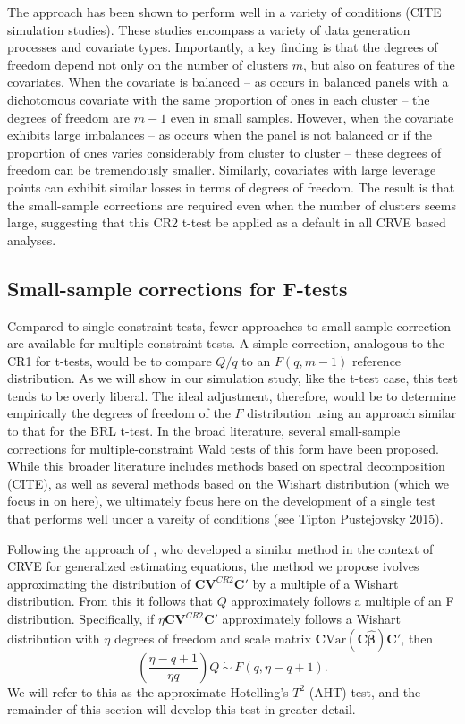 \documentclass[12pt]{article}\usepackage[]{graphicx}\usepackage[]{color}
\newcommand{\Var}{\text{Var}}
\newcommand{\bm}{\mathbf}
\newcommand{\bs}{\boldsymbol}
\begin{document}
The \citet{McCaffrey2001generalizations} approach has been shown to perform well in a variety of conditions (CITE simulation studies). These studies encompass a variety of data generation processes and covariate types. Importantly, a key finding is that the degrees of freedom depend not only on the number of clusters $m$, but also on features of the covariates. When the covariate is balanced -- as occurs in balanced panels with a dichotomous covariate with the same proportion of ones in each cluster -- the degrees of freedom are $m - 1$ even in small samples. However, when the covariate exhibits large imbalances -- as occurs when the panel is not balanced or if the proportion of ones varies considerably from cluster to cluster -- these degrees of freedom can be tremendously smaller. Similarly, covariates with large leverage points can exhibit similar losses in terms of degrees of freedom. The result is that the small-sample corrections are required even when the number of clusters seems large, suggesting that this CR2 t-test be applied as a default in all CRVE based analyses. 

\subsection{Small-sample corrections for F-tests}

Compared to single-constraint tests, fewer approaches to small-sample correction are available for multiple-constraint tests. 
A simple correction, analogous to the CR1 for t-tests, would be to compare $Q / q$ to an $F(q, m - 1)$ reference distribution. 
As we will show in our simulation study, like the t-test case, this test tends to be overly liberal. 
The ideal adjustment, therefore, would be to determine empirically the degrees of freedom of the $F$ distribution using an approach similar to that for the BRL t-test. In the broad literature, several small-sample corrections for multiple-constraint Wald tests of this form have been proposed. 
While this broader literature includes methods based on spectral decomposition (CITE), as well as several methods based on the Wishart distribution (which we focus in on here), we ultimately focus here on the development of a single test that performs well under a vareity of conditions (see Tipton Pustejovsky 2015). 

Following the approach of \cite{Pan2002small}, who developed a similar method in the context of CRVE for generalized estimating equations, the method we propose ivolves approximating the distribution of $\bm{C}\bm{V}^{CR2} \bm{C}'$ by a multiple of a Wishart distribution. From this it follows that $Q$ approximately follows a multiple of an F distribution. Specifically, if $\eta \bm{C}\bm{V}^{CR2} \bm{C}'$ approximately follows a Wishart distribution with $\eta$ degrees of freedom and scale matrix $\bm{C} \Var\left(\bm{C}\bs{\hat\beta}\right)\bm{C}'$, then 
\begin{equation}
\label{eq:AHT}
\left(\frac{\eta - q + 1}{\eta q}\right) Q \ \dot\sim \ F(q, \eta - q + 1).
\end{equation}
We will refer to this as the approximate Hotelling's $T^2$ (AHT) test, and the remainder of this section will develop this test in greater detail.
\end{document}
